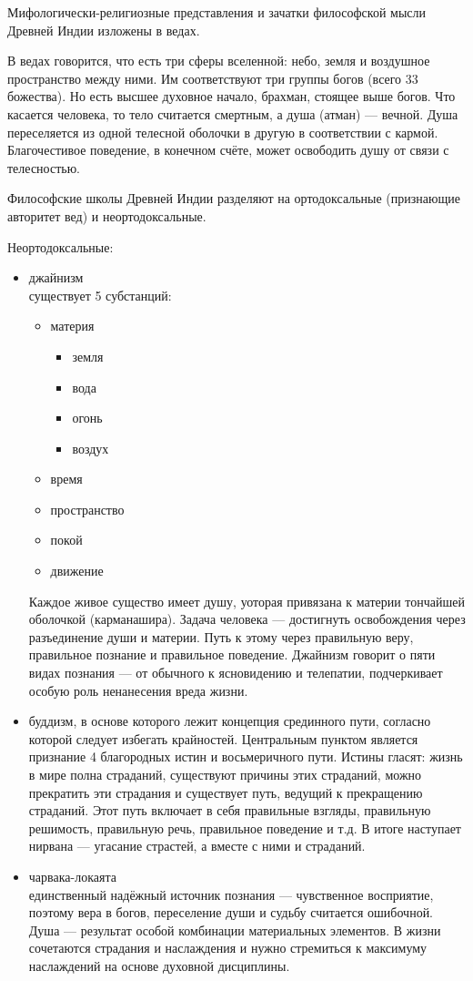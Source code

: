  Мифологически-религиозные представления и зачатки философской мысли Древней Индии изложены в ведах.

 В ведах говорится, что есть три сферы вселенной: небо, земля и воздушное пространство между ними. Им соответствуют три группы богов (всего 33 божества). Но есть высшее духовное начало, брахман, стоящее выше богов. Что касается человека, то тело считается смертным, а душа (атман) --- вечной. Душа переселяется из одной телесной оболочки в другую в соответствии с кармой. Благочестивое поведение, в конечном счёте, может освободить душу от связи с телесностью.

 Философские школы Древней Индии разделяют на ортодоксальные (признающие авторитет вед) и неортодоксальные.

 Неортодоксальные:
 \begin{itemize}
    \item джайнизм\\
    существует 5 субстанций:
    \begin{itemize}
        \item материя
        \begin{itemize}
            \item земля
            \item вода
            \item огонь
            \item воздух
        \end{itemize}
        \item время
        \item пространство
        \item покой
        \item движение
    \end{itemize}
    Каждое живое существо имеет душу, уоторая привязана к материи тончайшей оболочкой (карманашира). Задача человека --- достигнуть освобождения через разъединение души и материи. Путь к этому через правильную веру, правильное познание и правильное поведение. Джайнизм говорит о пяти видах познания --- от обычного к ясновидению и телепатии, подчеркивает особую роль ненанесения вреда жизни.
    \item буддизм, в основе которого лежит концепция срединного пути, согласно которой следует избегать крайностей. Центральным пунктом является признание 4 благородных истин и восьмеричного пути. Истины гласят: жизнь в мире полна страданий, существуют причины этих страданий, можно прекратить эти страдания и существует путь, ведущий к прекращению страданий. Этот путь включает в себя правильные взгляды, правильную решимость, правильную речь, правильное поведение и т.д. В итоге наступает нирвана --- угасание страстей, а вместе с ними и страданий.
    \item чарвака-локаята\\
    единственный надёжный источник познания --- чувственное восприятие, поэтому вера в богов, переселение души и судьбу считается ошибочной. Душа --- результат особой комбинации материальных элементов. В жизни сочетаются страдания и наслаждения и нужно стремиться к максимуму наслаждений на основе духовной дисциплины.
\end{itemize}
 
